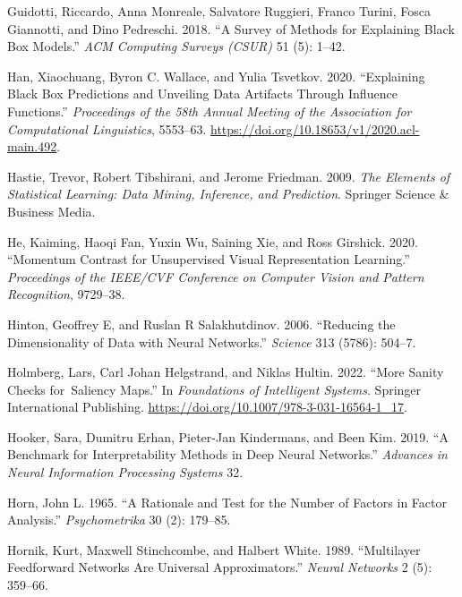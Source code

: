 \documentclass[
  letterpaper,
]{report}
\newlength{\cslhangindent}
\newenvironment{CSLReferences}[2] %
 {\begin{list}{}{%
  \setlength{\itemindent}{0pt}
  \setlength{\leftmargin}{0pt}
  \setlength{\parsep}{0pt}
  \ifodd #1
   \setlength{\leftmargin}{\cslhangindent}
   \setlength{\itemindent}{-1\cslhangindent}
  \fi
  \setlength{\itemsep}{#2\baselineskip}}}
 {\end{list}}
\begin{document}
\begin{CSLReferences}{1}{1}
Guidotti, Riccardo, Anna Monreale, Salvatore Ruggieri, Franco Turini,
Fosca Giannotti, and Dino Pedreschi. 2018. {``A Survey of Methods for
Explaining Black Box Models.''} \emph{ACM Computing Surveys (CSUR)} 51
(5): 1--42.

Han, Xiaochuang, Byron C. Wallace, and Yulia Tsvetkov. 2020.
{``Explaining Black Box Predictions and Unveiling Data Artifacts Through
Influence Functions.''} \emph{Proceedings of the 58th Annual Meeting of
the Association for Computational Linguistics}, 5553--63.
\url{https://doi.org/10.18653/v1/2020.acl-main.492}.

Hastie, Trevor, Robert Tibshirani, and Jerome Friedman. 2009. \emph{The
Elements of Statistical Learning: Data Mining, Inference, and
Prediction}. Springer Science \& Business Media.

He, Kaiming, Haoqi Fan, Yuxin Wu, Saining Xie, and Ross Girshick. 2020.
{``Momentum Contrast for Unsupervised Visual Representation Learning.''}
\emph{Proceedings of the IEEE/CVF Conference on Computer Vision and
Pattern Recognition}, 9729--38.

Hinton, Geoffrey E, and Ruslan R Salakhutdinov. 2006. {``Reducing the
Dimensionality of Data with Neural Networks.''} \emph{Science} 313
(5786): 504--7.

Holmberg, Lars, Carl Johan Helgstrand, and Niklas Hultin. 2022. {``More
Sanity Checks for~Saliency Maps.''} In \emph{Foundations of Intelligent
Systems}. Springer International Publishing.
\url{https://doi.org/10.1007/978-3-031-16564-1_17}.

Hooker, Sara, Dumitru Erhan, Pieter-Jan Kindermans, and Been Kim. 2019.
{``A Benchmark for Interpretability Methods in Deep Neural Networks.''}
\emph{Advances in Neural Information Processing Systems} 32.

Horn, John L. 1965. {``A Rationale and Test for the Number of Factors in
Factor Analysis.''} \emph{Psychometrika} 30 (2): 179--85.

Hornik, Kurt, Maxwell Stinchcombe, and Halbert White. 1989.
{``Multilayer Feedforward Networks Are Universal Approximators.''}
\emph{Neural Networks} 2 (5): 359--66.


\end{CSLReferences}
\end{document}
